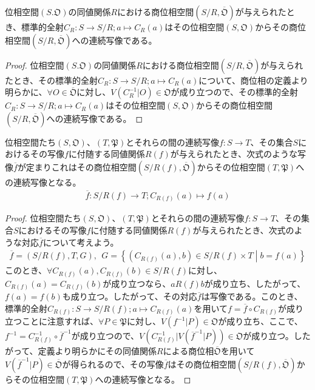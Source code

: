 \documentclass[dvipdfmx]{jsarticle}
\begin{document}
\begin{thm}\label{8.1.4.34}
位相空間$\left( S.\mathfrak{O} \right)$の同値関係$R$における商位相空間$\left( {S}/{R},\overline{\mathfrak{O}} \right)$が与えられたとき、標準的全射$C_{R}:S \rightarrow {S}/{R};a \mapsto C_{R}(a)$はその位相空間$\left( S,\mathfrak{O} \right)$からその商位相空間$\left( {S}/{R},\overline{\mathfrak{O}} \right)$への連続写像である。
\end{thm}
\begin{proof}
位相空間$\left( S.\mathfrak{O} \right)$の同値関係$R$における商位相空間$\left( {S}/{R},\overline{\mathfrak{O}} \right)$が与えられたとき、その標準的全射$C_{R}:S \rightarrow {S}/{R};a \mapsto C_{R}(a)$について、商位相の定義より明らかに、$\forall O \in \overline{\mathfrak{O}}$に対し、$V\left( C_{R}^{- 1}|O \right)\in \mathfrak{O}$が成り立つので、その標準的全射$C_{R}:S \rightarrow {S}/{R};a \mapsto C_{R}(a)$はその位相空間$\left( S,\mathfrak{O} \right)$からその商位相空間$\left( {S}/{R},\overline{\mathfrak{O}} \right)$への連続写像である。
\end{proof}
\begin{thm}\label{8.1.4.35}
位相空間たち$\left( S,\mathfrak{O} \right)$、$\left( T,\mathfrak{P} \right)$とそれらの間の連続写像$f:S \rightarrow T$、その集合$S$におけるその写像$f$に付随する同値関係$R(f)$が与えられたとき、次式のような写像$\overline{f}$が定まりこれはその商位相空間$\left( {S}/{R(f)},\overline{\mathfrak{O}} \right)$からその位相空間$\left( T,\mathfrak{P} \right)$への連続写像となる。
\begin{align*}
\overline{f}:{S}/{R(f)} \rightarrow T;C_{R(f)}(a) \mapsto f(a)
\end{align*}
\end{thm}
\begin{proof}
位相空間たち$\left( S,\mathfrak{O} \right)$、$\left( T,\mathfrak{P} \right)$とそれらの間の連続写像$f:S \rightarrow T$、その集合$S$におけるその写像$f$に付随する同値関係$R(f)$が与えられたとき、次式のような対応$\overline{f}$について考えよう。
\begin{align*}
\overline{f} = \left( {S}/{R(f)},T,G \right),\ \ G = \left\{ \left( C_{R(f)}(a),b \right) \in {S}/{R(f)} \times T \middle| b = f(a) \right\}
\end{align*}
このとき、$\forall C_{R(f)}(a),C_{R(f)}(b) \in {S}/{R(f)}$に対し、$C_{R(f)}(a) = C_{R(f)}(b)$が成り立つなら、$aR(f)b$が成り立ち、したがって、$f(a) = f(b)$も成り立つ。したがって、その対応$\overline{f}$は写像である。このとき、標準的全射$C_{R(f)}:S \rightarrow {S}/{R(f)};a \mapsto C_{R(f)}(a)$を用いて$f = \overline{f} \circ C_{R(f)}$が成り立つことに注意すれば、$\forall P \in \mathfrak{P}$に対し、$V\left( f^{- 1}|P \right)\in \mathfrak{O}$が成り立ち、ここで、$f^{- 1} = C_{R(f)}^{- 1} \circ {\overline{f}}^{- 1}$が成り立つので、$V\left( C_{R(f)}^{- 1}|V\left( {\overline{f}}^{- 1}|P \right) \right)\in \mathfrak{O}$が成り立つ。したがって、定義より明らかにその同値関係$R$による商位相$\overline{\mathfrak{O}}$を用いて$V\left( {\overline{f}}^{- 1}|P \right) \in \overline{\mathfrak{O}}$が得られるので、その写像$\overline{f}$はその商位相空間$\left( {S}/{R(f)},\overline{\mathfrak{O}} \right)$からその位相空間$\left( T,\mathfrak{P} \right)$への連続写像となる。
\end{proof}
\end{document}
